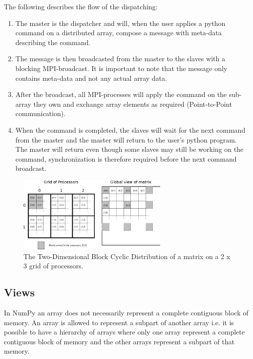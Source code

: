 \documentclass[10pt]{article}
\begin{document}
The following describes the flow of the dispatching:
\begin{enumerate}
\item The master is the dispatcher and will, when the user applies a python command on a distributed array, compose a message with meta-data describing the command. 
\item The message is then broadcasted from the master to the slaves with a blocking MPI-broadcast. It is important to note that the message only contains meta-data and not any actual array data.
\item After the broadcast, all MPI-processes will apply the command on the sub-array they own and exchange array elements as required (Point-to-Point communication).
\item When the command is completed, the slaves will wait for the next command from the master and the master will return to the user's python program. The master will return even though some slaves may still be working on the command, synchronization is therefore required before the next command broadcast.
\end{enumerate}


\begin{figure}
 \centering
 \includegraphics[width=280px]{gfx/datalayout}
 \caption{The Two-Dimensional Block Cyclic Distribution of a matrix on a 2 x 3 grid of processors.}
 \label{fig:datalayout}
\end{figure}


\subsection{Views}
In NumPy an array does not necessarily represent a complete contiguous block of memory. An array is allowed to represent a subpart of another array i.e. it is possible to have a hierarchy of arrays where only one array represent a complete contiguous block of memory and the other arrays represent a subpart of that memory. 
\end{document}
